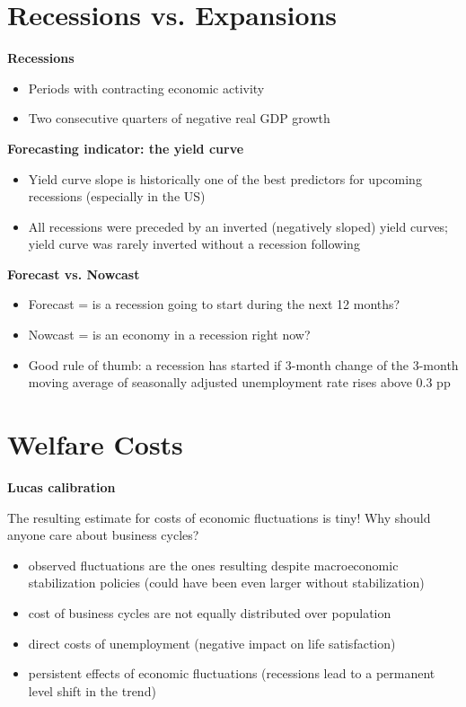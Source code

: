\documentclass[a4paper]{article}
\begin{document}
\section{Recessions vs. Expansions}
\textbf{Recessions}
\begin{itemize}
    \item Periods with contracting economic activity
    \item Two consecutive quarters of negative real GDP growth
\end{itemize}
\textbf{Forecasting indicator: the yield curve}
\begin{itemize}
    \item Yield curve slope is historically one of the best predictors for upcoming recessions (especially in the US)
    \item All recessions were preceded by an inverted (negatively sloped) yield curves; yield curve was rarely inverted without a recession following 
\end{itemize}
\textbf{Forecast vs. Nowcast}
\begin{itemize}
    \item Forecast = is a recession going to start during the next 12 months?
    \item Nowcast = is an economy in a recession right now?
    \item Good rule of thumb: a recession has started if 3-month change of the 3-month moving average of seasonally adjusted unemployment rate rises above 0.3 pp
\end{itemize}

\section{Welfare Costs}
\textbf{Lucas calibration}

The resulting estimate for costs of economic fluctuations is tiny! Why should anyone care about business cycles?
\begin{itemize}
    \item observed fluctuations are the ones resulting despite macroeconomic stabilization policies (could have been even larger without stabilization)
    \item cost of business cycles are not equally distributed over population
    \item direct costs of unemployment (negative impact on life satisfaction)
    \item persistent effects of economic fluctuations (recessions lead to a permanent level shift in the trend)
\end{itemize}
\end{document}
